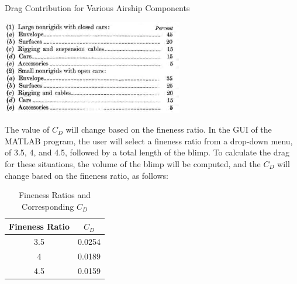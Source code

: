 \documentclass[../main.tex]{subfiles}
\begin{document}
\begin{table}[H]
	\centering
	\caption{Drag Contribution for Various Airship Components \cite{airshipAerodynamics}}
	\includegraphics[width=.5\linewidth]{img/drag/contributions.PNG}
	\label{tbl:contributionsTable}
\end{table}

The value of $C_D$ will change based on the fineness ratio. In the GUI of the MATLAB program, the user will select a fineness ratio from a drop-down menu, of 3.5, 4, and 4.5, followed by a total length of the blimp. To calculate the drag for these situations, the volume of the blimp will be computed, and the $C_D$ will change based on the fineness ratio, as follows:
\begin{table}[H]
	\caption{Fineness Ratios and Corresponding $C_D$}
	\label{tbl:finenessCoefficient}
\begin{center}
	\begin{tabular}{|c|c|}
	\hline 
	\textbf{Fineness Ratio} & \textbf{$C_D$} \\ 
	\hline 
	3.5 & 0.0254 \\ 
	\hline 
	4 & 0.0189 \\ 
	\hline 
	4.5 & 0.0159 \\ 
	\hline 
\end{tabular} 
\end{center}
\end{table}
\end{document}
